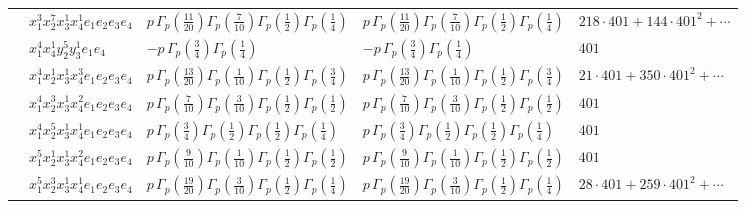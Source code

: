 \documentclass[11pt]{article}
\begin{document}
\begin{table}[ht]
{\begin{tabular}{@{}lllll@{}}
 & $x_{1}^{3} x_{2}^{7} x_{3}^{1} x_{4}^{1}  e_{1} e_{2} e_{3} e_{4}$ & $p \, \Gamma_p \left( \frac{11}{20} \right) \Gamma_p \left( \frac{7}{10} \right) \Gamma_p \left( \frac{1}{2} \right) \Gamma_p \left( \frac{1}{4} \right)$ & $p \, \Gamma_p \left( \frac{11}{20} \right) \Gamma_p \left( \frac{7}{10} \right) \Gamma_p \left( \frac{1}{2} \right) \Gamma_p \left( \frac{1}{4} \right)$ & $218{\cdot}401{+}144{\cdot}401^{2}{+}\cdots$ \\
 & $x_{1}^{4} x_{4}^{1} y_{2}^{5} y_{3}^{1} e_{1} e_{4}$ & $- p \, \Gamma_p \left( \frac{3}{4} \right) \Gamma_p \left( \frac{1}{4} \right)$ & $- p \, \Gamma_p \left( \frac{3}{4} \right) \Gamma_p \left( \frac{1}{4} \right)$ & $401$ \\
 & $x_{1}^{4} x_{2}^{1} x_{3}^{1} x_{4}^{3}  e_{1} e_{2} e_{3} e_{4}$ & $p \, \Gamma_p \left( \frac{13}{20} \right) \Gamma_p \left( \frac{1}{10} \right) \Gamma_p \left( \frac{1}{2} \right) \Gamma_p \left( \frac{3}{4} \right)$ & $p \, \Gamma_p \left( \frac{13}{20} \right) \Gamma_p \left( \frac{1}{10} \right) \Gamma_p \left( \frac{1}{2} \right) \Gamma_p \left( \frac{3}{4} \right)$ & $21{\cdot}401{+}350{\cdot}401^{2}{+}\cdots$ \\
 & $x_{1}^{4} x_{2}^{3} x_{3}^{1} x_{4}^{2}  e_{1} e_{2} e_{3} e_{4}$ & $p \, \Gamma_p \left( \frac{7}{10} \right) \Gamma_p \left( \frac{3}{10} \right) \Gamma_p \left( \frac{1}{2} \right) \Gamma_p \left( \frac{1}{2} \right)$ & $p \, \Gamma_p \left( \frac{7}{10} \right) \Gamma_p \left( \frac{3}{10} \right) \Gamma_p \left( \frac{1}{2} \right) \Gamma_p \left( \frac{1}{2} \right)$ & $401$ \\
 & $x_{1}^{4} x_{2}^{5} x_{3}^{1} x_{4}^{1}  e_{1} e_{2} e_{3} e_{4}$ & $p \, \Gamma_p \left( \frac{3}{4} \right) \Gamma_p \left( \frac{1}{2} \right) \Gamma_p \left( \frac{1}{2} \right) \Gamma_p \left( \frac{1}{4} \right)$ & $p \, \Gamma_p \left( \frac{3}{4} \right) \Gamma_p \left( \frac{1}{2} \right) \Gamma_p \left( \frac{1}{2} \right) \Gamma_p \left( \frac{1}{4} \right)$ & $401$ \\
 & $x_{1}^{5} x_{2}^{1} x_{3}^{1} x_{4}^{2}  e_{1} e_{2} e_{3} e_{4}$ & $p \, \Gamma_p \left( \frac{9}{10} \right) \Gamma_p \left( \frac{1}{10} \right) \Gamma_p \left( \frac{1}{2} \right) \Gamma_p \left( \frac{1}{2} \right)$ & $p \, \Gamma_p \left( \frac{9}{10} \right) \Gamma_p \left( \frac{1}{10} \right) \Gamma_p \left( \frac{1}{2} \right) \Gamma_p \left( \frac{1}{2} \right)$ & $401$ \\
 & $x_{1}^{5} x_{2}^{3} x_{3}^{1} x_{4}^{1}  e_{1} e_{2} e_{3} e_{4}$ & $p \, \Gamma_p \left( \frac{19}{20} \right) \Gamma_p \left( \frac{3}{10} \right) \Gamma_p \left( \frac{1}{2} \right) \Gamma_p \left( \frac{1}{4} \right)$ & $p \, \Gamma_p \left( \frac{19}{20} \right) \Gamma_p \left( \frac{3}{10} \right) \Gamma_p \left( \frac{1}{2} \right) \Gamma_p \left( \frac{1}{4} \right)$ & $28{\cdot}401{+}259{\cdot}401^{2}{+}\cdots$ \\

\end{tabular}}
\end{table}
\end{document}
